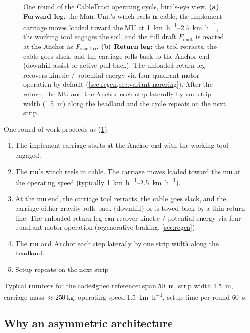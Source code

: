 \documentclass[11pt,a4paper]{article}
\begin{document}
\begin{figure}[H]
\begin{tikzpicture}
\end{tikzpicture}
\caption{One round of the CableTract operating cycle, bird's-eye view. \textbf{(a) Forward leg:} the Main Unit's winch reels in cable, the implement carriage moves loaded toward the MU at \SIrange{1}{2.5}{\kilo\meter\per\hour}, the working tool engages the soil, and the full draft $F_{\text{draft}}$ is reacted at the Anchor as $F_{\text{reaction}}$. \textbf{(b) Return leg:} the tool retracts, the cable goes slack, and the carriage rolls back to the Anchor end (downhill assist or active pull-back). The unloaded return leg recovers kinetic / potential energy via four-quadrant motor operation by default (\cref{sec:regen,sec:variant-norering}). After the return, the MU and the Anchor each step laterally by one strip width (\SI{1.5}{\meter}) along the headland and the cycle repeats on the next strip.}
\label{fig:f0c}
\end{figure}

One round of work proceeds as (\cref{fig:f0c}):

\begin{enumerate}[leftmargin=1.6em,itemsep=0.1em]
    \item The implement carriage starts at the Anchor end with the working tool engaged.
    \item The \gls{mu}'s winch reels in cable. The carriage moves loaded toward the \gls{mu} at the operating speed (typically \SIrange{1}{2.5}{\kilo\meter\per\hour}).
    \item At the \gls{mu} end, the carriage tool retracts, the cable goes slack, and the carriage either gravity-rolls back (downhill) or is towed back by a thin return line. The unloaded return leg can recover kinetic / potential energy via four-quadrant motor operation (regenerative braking, \cref{sec:regen}).
    \item The \gls{mu} and Anchor each step laterally by one strip width along the headland.
    \item Setup repeats on the next strip.
\end{enumerate}

Typical numbers for the codesigned reference: span \SI{50}{\meter}, strip width \SI{1.5}{\meter}, carriage mass ${\approx}\SI{250}{\kilogram}$, operating speed \SI{1.5}{\kilo\meter\per\hour}, setup time per round \SI{60}{\second}.

\subsection{Why an asymmetric architecture}\label{sec:asymmetry}
\end{document}
